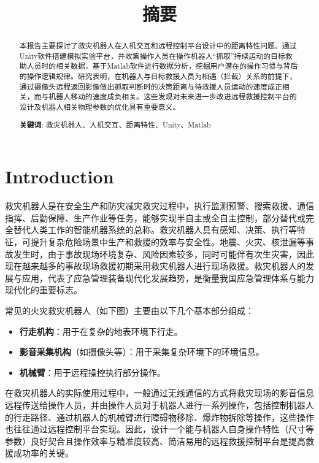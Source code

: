 \documentclass[12pt]{article}  %
\title{摘要}
\begin{document}
	\begin{abstract}
		\vspace{15pt}
		本报告主要探讨了救灾机器人在人机交互和远程控制平台设计中的距离特性问题。通过Unity软件搭建模拟实验平台，并收集操作人员在操作机器人“抓取”持续运动的目标救助人员时的相关数据，基于Matlab软件进行数据分析，挖掘用户潜在的操作习惯与背后的操作逻辑规律。研究表明，在机器人与目标救援人员为相遇（拦截）关系的前提下，通过摄像头远程返回影像做出抓取判断时的决策距离与待救援人员运动的速度成正相关，而与机器人移动的速度成负相关。这些发现对未来进一步改进远程救援控制平台的设计及机器人相关物理参数的优化具有重要意义。
		\vspace{5pt}
		\noindent
		
		\textbf{关键词}: 救灾机器人、人机交互、距离特性、Unity、Matlab
	\end{abstract}
	
	\maketitle  
	
	\tableofcontents
	
	\section{Introduction}
	救灾机器人是在安全生产和防灾减灾救灾过程中，执行监测预警、搜索救援、通信指挥、后勤保障、生产作业等任务，能够实现半自主或全自主控制，部分替代或完全替代人类工作的智能机器系统的总称。救灾机器人具有感知、决策、执行等特征，可提升复杂危险场景中生产和救援的效率与安全性。地震、火灾、核泄漏等事故发生时，由于事故现场环境复杂、风险因素较多，同时可能伴有次生灾害，因此现在越来越多的事故现场救援初期采用救灾机器人进行现场救援。救灾机器人的发展与应用，代表了应急管理装备现代化发展趋势，是衡量我国应急管理体系与能力现代化的重要标志。
	
	常见的火灾救灾机器人（如下图）主要由以下几个基本部分组成：
	\begin{itemize}
		\setlength{\parsep}{0ex} %
		\setlength{\topsep}{2ex} %
		\setlength{\itemsep}{1ex} %
		\item \textbf{行走机构}：用于在复杂的地表环境下行走。
		\item \textbf{影音采集机构}（如摄像头等）：用于采集复杂环境下的环境信息。
		\item \textbf{机械臂}：用于远程操控执行部分操作。
	\end{itemize}

	在救灾机器人的实际使用过程中，一般通过无线通信的方式将救灾现场的影音信息远程传送给操作人员，并由操作人员对于机器人进行一系列操作，包括控制机器人的行走路径、通过机器人的机械臂进行障碍物移除、爆炸物拆除等操作，这些操作也往往通过远程控制平台实现。因此，设计一个能与机器人自身操作特性（尺寸等参数）良好契合且操作效率与精准度较高、简洁易用的远程救援控制平台是提高救援成功率的关键。
	
\end{document}

